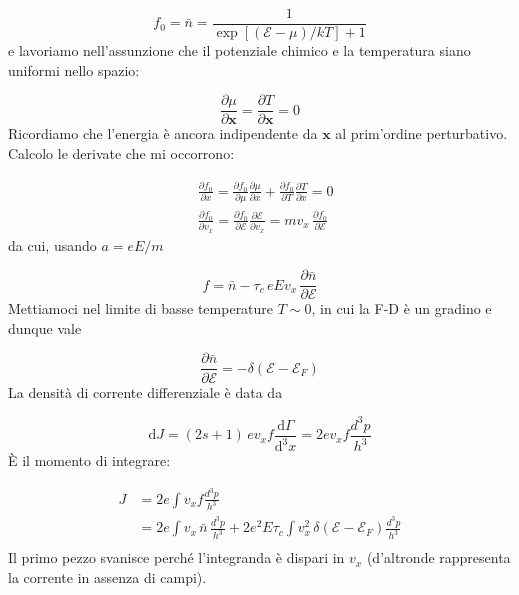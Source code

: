 \documentclass[a4paper]{report}
\begin{document}
\begin{equation}
    f_0 = \bar{n} = \frac{1}{\exp[(\mathcal{E}-\mu)/ k T] + 1}
\end{equation}
e lavoriamo nell'assunzione che il potenziale chimico e la temperatura siano uniformi nello spazio:

\begin{equation}
    \frac{\partial \mu}{\partial \mathbf{x}} = \frac{\partial T}{\partial \mathbf{x}} = 0
\end{equation}
Ricordiamo che l'energia è ancora indipendente da $\mathbf{x}$ al prim'ordine perturbativo. Calcolo le derivate che mi occorrono:

\begin{equation}
\begin{split}
     & \frac{\partial f_0}{\partial x} =\frac{\partial f_0}{\partial \mu} \frac{\partial \mu}{\partial x} + \frac{\partial f_0}{\partial T}  \frac{\partial T}{\partial x} = 0 \\
     & \frac{\partial f_0}{\partial v_x} = \frac{\partial f_0}{\partial \mathcal{E}}\frac{\partial \mathcal{E}}{\partial v_x} = m v_x\, \frac{\partial f_0}{\partial \mathcal{E}}
\end{split}
\end{equation}
da cui, usando $a = e E/m$

\begin{equation}
    f = \bar{n} - \tau_c \,eEv_x\, \frac{\partial \bar{n}}{\partial \mathcal{E}}
\end{equation}
Mettiamoci nel limite di basse temperature $T \sim 0$, in cui la F-D è un gradino e dunque vale

\begin{equation}
    \frac{\partial \bar{n}}{\partial \mathcal{E}} = - \delta(\mathcal{E}-\mathcal{E}_F) 
\end{equation}
La densità di corrente differenziale è data da

\begin{equation}
    \mathrm{d}J = (2s+1)\, e v_x f \frac{\mathrm{d}\Gamma}{\mathrm{d}^3 x} = 2 e v_x f \frac{d^3 p}{h^3} 
\end{equation}
È il momento di integrare: 

\begin{equation}
    \begin{split}
        J & = 2 e \int v_x f  \frac{d^3 p}{h^3} \\
        & = 2 e \int  v_x \,\bar{n} \, \frac{d^3 p}{h^3} + 2 e^2 E \tau_c \int v_x^2\, \delta(\mathcal{E}-\mathcal{E}_F)\frac{d^3 p}{h^3}  \\
    \end{split}
\end{equation}
Il primo pezzo svanisce perché l'integranda è dispari in $v_x$ (d'altronde rappresenta la corrente in assenza di campi). 
\end{document}
